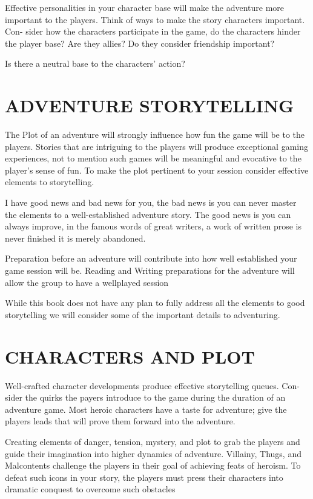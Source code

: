 \documentclass{article}
\begin{document}
	Effective personalities in your character base will make the adventure more important to the
players. Think of ways to make the story characters important. Con- sider how the characters
participate in the game, do the characters hinder the player base? Are they allies? Do they
consider friendship important?
	
    Is there a neutral base to the characters’ action?

\section{ADVENTURE STORYTELLING}

	The Plot of an adventure will strongly influence how fun the game will be to the players. Stories
that are intriguing to the players will produce exceptional gaming experiences, not to mention
such games will be meaningful and evocative to the player’s sense of fun. To make the plot
pertinent to your session consider effective elements to storytelling.

	I have good news and bad news for you, the bad news is you can never master the elements to a
well-established adventure story. The good news is you can always improve, in the famous
words of great writers, a work of written prose is never finished it is merely abandoned.

	Preparation before an adventure will contribute into how well established your game session will
be. Reading and Writing preparations for the adventure will allow the group to have a wellplayed
session

	While this book does not have any plan to fully address all the elements to good storytelling we
will consider some of the important details to adventuring.

\section{CHARACTERS AND PLOT}

	Well-crafted character developments produce effective storytelling queues. Con- sider the quirks
the payers introduce to the game during the duration of an adventure game. Most heroic
characters have a taste for adventure; give the players leads that will prove them forward into the
adventure.

	Creating elements of danger, tension, mystery, and plot to grab the players and guide their
imagination into higher dynamics of adventure. Villainy, Thugs, and Malcontents challenge the
players in their goal of achieving feats of heroism. To defeat such icons in your story, the players
must press their characters into dramatic conquest to overcome such obstacles
\end{document}
